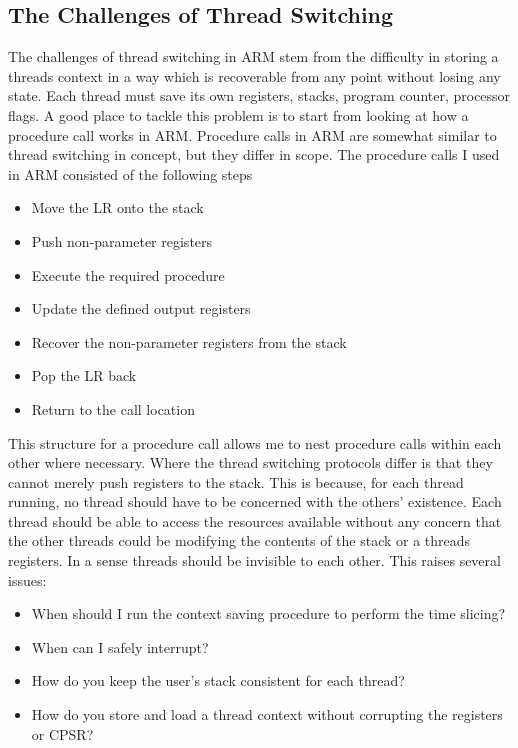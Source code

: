 \subsection{The Challenges of Thread Switching}
\label{chap:Threading}
The challenges of thread switching in ARM stem from the difficulty in storing a threads context in a way which is recoverable from any point without losing any state. Each thread must save its own registers, stacks, program counter, processor flags. A good place to tackle this problem is to start from looking at how a procedure call works in ARM. Procedure calls in ARM are somewhat similar to thread switching in concept, but they differ in scope. The procedure calls \cite{arm_man} I used in ARM consisted of the following steps
\begin{itemize}
	\item Move the LR onto the stack 
	\item Push non-parameter registers
	\item Execute the required procedure
	\item Update the defined output registers
	\item Recover the non-parameter registers from the stack
	\item Pop the LR back
	\item Return to the call location
\end{itemize} %
This structure for a procedure call allows me to nest procedure calls within each other where necessary. Where the thread switching protocols differ is that they cannot merely push registers to the stack. This is because, for each thread running, no thread should have to be concerned with the others' existence. Each thread should be able to access the resources available without any concern that the other threads could be modifying the contents of the stack or a threads registers. In a sense threads should be invisible to each other. This raises several issues:
\begin{itemize}
	\item When should I run the context saving procedure to perform the time slicing?
	\item When can I safely interrupt?
	\item How do you keep the user's stack consistent for each thread?
	\item How do you store and load a thread context without corrupting the registers or CPSR?
\end{itemize}
